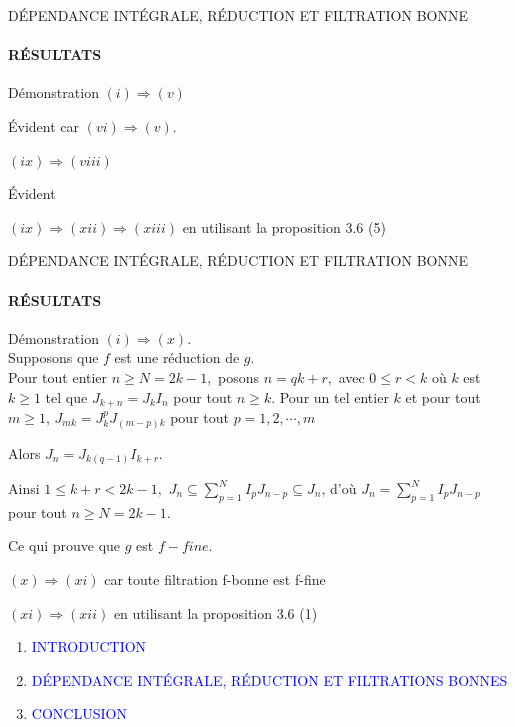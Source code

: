 \documentclass[11pt,a4paper]{beamer}
\begin{document}
\begin{frame}{DÉPENDANCE INTÉGRALE, RÉDUCTION ET FILTRATION BONNE}
	\framesubtitle{RÉSULTATS}
	\begin{block}{Démonstration}
		$(i)\Longrightarrow (v)$
		
		Évident car $(vi)\Longrightarrow (v).$
		
		$(ix)\Longrightarrow (viii)$
		
		Évident
		
		$(ix)\Longrightarrow (xii)\Longrightarrow (xiii)$ en utilisant la proposition 3.6 (5)
		
	\end{block}
\end{frame}

\begin{frame}{DÉPENDANCE INTÉGRALE, RÉDUCTION ET FILTRATION BONNE}
	\framesubtitle{RÉSULTATS}
	\begin{block}{Démonstration}
		$(i)\Longrightarrow (x).$ \\
		Supposons que $f$ est une réduction de $g.$\\
		Pour tout entier $n\geq N=2k-1,$ posons $n=qk+r,$ avec $0\leq r<k$ où $k$
		est $k \geqslant 1$ tel que $J_{k+n}  = J_{k}I_n$ pour tout $n \geqslant k$. Pour un tel entier $k$ et pour tout $m \geqslant 1$, $J_{mk}=J_{k}^{p}J_{(m-p)k}
		$ pour tout $p=1,2,\cdots,m$
		
		Alors $J_{n}=J_{k(q-1)}I_{k+r}.$
		
		Ainsi $1\leq k+r<2k-1,$ $J_{n}\subseteq
		\sum\limits_{p=1}^{N}I_{p}J_{n-p}\subseteq J_{n}$, d'où $J_{n}=\sum\limits_{p=1}^{N}I_{p}J_{n-p}$ pour tout $n\geq N=2k-1$.
		
		Ce qui prouve que $g$ est $f-fine.$
		
		$(x)\Longrightarrow (xi)$ car toute filtration f-bonne est f-fine
		
		$(xi)\Longrightarrow (xii)$ en utilisant la proposition 3.6 (1)
	\end{block}
\end{frame}

\begin{frame}
	\begin{enumerate}
		\item<0> \textcolor{blue}{INTRODUCTION}\\
		\item<0> \textcolor{blue}{DÉPENDANCE INTÉGRALE, RÉDUCTION ET FILTRATIONS BONNES }\\
		\item<1> \textcolor{blue}{CONCLUSION}\\
	\end{enumerate}
\end{frame}
\end{document}
